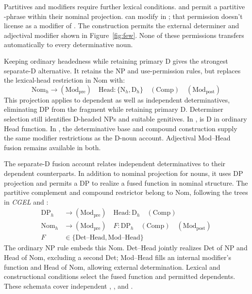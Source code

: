 \documentclass[12pt]{article}
\begin{document}
Partitives and modifiers require further lexical conditions.  and  permit a partitive -phrase within their nominal projection.  can modify  in ; that permission doesn't license  as a modifier of . The construction  permits the external determiner and adjectival modifier shown in Figure~\ref{fig:few}. None of these permissions transfers automatically to every determinative noun.

Keeping ordinary headedness while retaining primary D gives the strongest separate-D alternative. It retains the NP and use-permission rules, but replaces the lexical-head restriction in Nom with:
\[
\mathrm{Nom}_{h}\to(\mathrm{Mod}_{\mathrm{pre}})\quad\mathrm{Head}:\{\mathrm{N}_{h},\mathrm{D}_{h}\}\quad(\mathrm{Comp})\quad(\mathrm{Mod}_{\mathrm{post}})
\]
This projection applies to dependent as well as independent determinatives, eliminating DP from the fragment while retaining primary D. Determiner selection still identifies D-headed NPs and suitable genitives. In ,  is D in ordinary Head function. In , the determinative base and compound construction supply the same modifier restrictions as the D-noun account. Adjectival Mod--Head fusion remains available in both.

The separate-D fusion account relates independent determinatives to their dependent counterparts. In addition to nominal projection for nouns, it uses DP projection and permits a DP to realize a fused function in nominal structure. The partitive complement and compound restrictor belong to Nom, following the trees in \textit{CGEL} and \textcite[582]{Payne2007}:
\[
\begin{aligned}
\mathrm{DP}_{h} &\to (\mathrm{Mod}_{\mathrm{pre}})\quad \mathrm{Head}:\mathrm{D}_{h}\quad (\mathrm{Comp}) \\
\mathrm{Nom}_{h} &\to (\mathrm{Mod}_{\mathrm{pre}})\quad F:\mathrm{DP}_{h}\quad (\mathrm{Comp})\quad (\mathrm{Mod}_{\mathrm{post}}) \\
F&\in\{\mathrm{Det\text{--}Head},\mathrm{Mod\text{--}Head}\}
\end{aligned}
\]
The ordinary NP rule embeds this Nom. Det--Head jointly realizes Det of NP and Head of Nom, excluding a second Det; Mod--Head fills an internal modifier's function and Head of Nom, allowing external determination. Lexical and constructional conditions select the fused function and permitted dependents. These schemata cover independent , ,  and .
\end{document}
